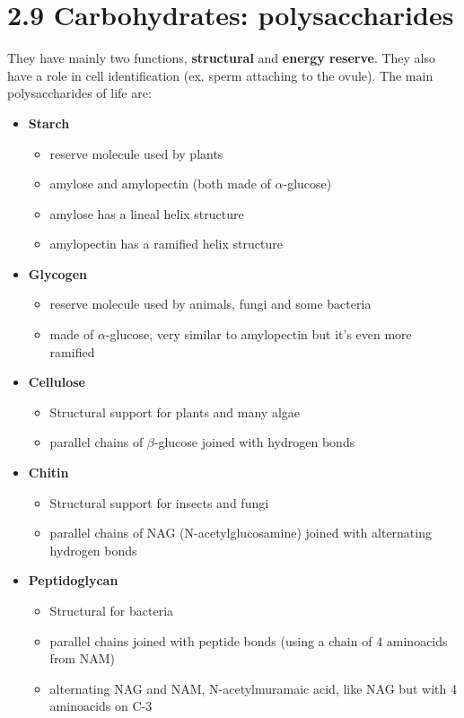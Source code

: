 \documentclass[a4paper,landscape,10pt]{cheatsheet}
\begin{document}
\section*{2.9 Carbohydrates: polysaccharides}
They have mainly two functions, \textbf{structural} and \textbf{energy reserve}. They also have a role in cell
identification (ex. sperm attaching to the ovule). The main polysaccharides of life are:
\begin{itemize}
  \item \textbf{Starch}
        \begin{itemize}
          \item reserve molecule used by plants
          \item amylose and amylopectin (both made of $\alpha$-glucose)
          \item amylose has a lineal helix structure
          \item amylopectin has a ramified helix structure
        \end{itemize}
  \item \textbf{Glycogen}
        \begin{itemize}
          \item reserve molecule used by animals, fungi and some bacteria
          \item made of $\alpha$-glucose, very similar to amylopectin but it's even more ramified
        \end{itemize}
  \item \textbf{Cellulose}
        \begin{itemize}
          \item Structural support for plants and many algae
          \item parallel chains of $\beta$-glucose joined with hydrogen bonds
        \end{itemize}
  \item \textbf{Chitin}
        \begin{itemize}
          \item Structural support for insects and fungi
          \item parallel chains of NAG (N-acetylglucosamine) joined with alternating hydrogen bonds
        \end{itemize}
  \item \textbf{Peptidoglycan}
        \begin{itemize}
          \item Structural for bacteria
          \item parallel chains joined with peptide bonds (using a chain of 4 aminoacids from NAM)
          \item alternating NAG and NAM, N-acetylmuramaic acid, like NAG but with 4 aminoacids on C-3
        \end{itemize}
\end{itemize}
\end{document}
